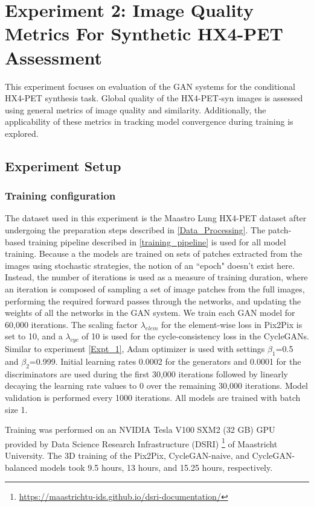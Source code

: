\section{Experiment 2: Image Quality Metrics For Synthetic HX4-PET Assessment}
\label{Expt_2}
This experiment focuses on evaluation of the GAN systems for the conditional HX4-PET synthesis task. Global quality of the HX4-PET-syn images is assessed using general metrics of image quality and similarity. Additionally, the applicability of these metrics in tracking model convergence during training is explored.


\subsection{Experiment Setup}

\subsubsection{Training configuration}
The dataset used in this experiment is the Maastro Lung HX4-PET dataset after undergoing the preparation steps described in \ref{Data_Processing}. The patch-based training pipeline described in \ref{training_pipeline} is used for all model training. Because a the models are trained on sets of patches extracted from the images using stochastic strategies, the notion of an ``epoch" doesn't exist here. Instead, the number of iterations is used as a measure of training duration, where an iteration is composed of sampling a set of image patches from the full images, performing the required forward passes through the networks, and updating the weights of all the networks in the GAN system. We train each GAN model for 60,000 iterations. The scaling factor $\lambda_{elem}$ for the element-wise loss in Pix2Pix is set to 10, and a $\lambda_{cyc}$ of 10 is used for the cycle-consistency loss in the CycleGANs. Similar to experiment \ref{Expt_1}, Adam optimizer is used with settings $\beta_1$=0.5 and $\beta_2$=0.999. Initial learning rates 0.0002 for the generators and 0.0001 for the discriminators are used during the first 30,000 iterations followed by linearly decaying the learning rate values to 0 over the remaining 30,000 iterations. Model validation is performed every 1000 iterations. All models are trained with batch size 1.

Training was performed on an NVIDIA Tesla V100 SXM2 (32 GB) GPU provided by Data Science Research Infrastructure (DSRI) \footnote{\url{https://maastrichtu-ids.github.io/dsri-documentation/}} of Maastricht University. The 3D training of the Pix2Pix, CycleGAN-naive, and CycleGAN-balanced models took 9.5 hours, 13 hours, and 15.25 hours, respectively. 


